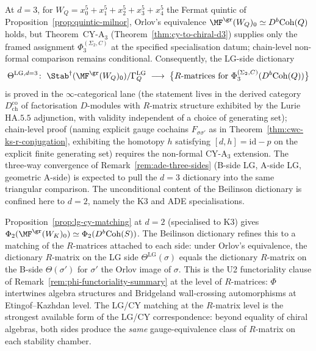 \begin{remark}[Quintic LG at \texorpdfstring{$d=3$}{d=3} and the conditional dictionary]
\label{rem:mf-quintic-conditional}
At $d=3$, for $W_Q=x_0^5+x_1^5+x_2^5+x_3^5+x_4^5$ the Fermat quintic of
Proposition~\ref{prop:quintic-milnor}, Orlov's equivalence
$\MF^{\gr}(W_Q)_0\simeq D^b\mathrm{Coh}(Q)$ holds, but Theorem~CY-A$_3$
(Theorem~\ref{thm:cy-to-chiral-d3}) supplies only the framed assignment
$\Phi_3^{(\Sigma_2,C)}$ at the specified specialisation datum;
chain-level non-formal comparison remains conditional. Consequently, the LG-side
dictionary
\[
 \Theta^{\mathrm{LG},d=3}\colon\;
 \Stab^\dagger(\MF^{\gr}(W_Q)_0)/\Gamma^{\mathrm{LG}}_Q
 \;\longrightarrow\;
	 \bigl\{R\text{-matrices for }\Phi_3^{(\Sigma_2,C)}(D^b\mathrm{Coh}(Q))\bigr\}
\]
is proved in the $\infty$-categorical lane (the statement lives
in the derived category $D^{\mathrm{co}}_{\mathrm{ch}}$ of
factorisation $D$-modules with $R$-matrix structure exhibited by
the Lurie $\mathrm{HA}.5.5$ adjunction, with validity independent of a
choice of generating set); chain-level proof (naming
explicit gauge cochains $F_{\sigma\sigma'}$ as in
Theorem~\ref{thm:cwc-ks-r-conjugation}, exhibiting the homotopy
$h$ satisfying $[d, h] = \mathrm{id} - p$ on the explicit
finite generating set) requires the non-formal CY-A$_3$ extension. The three-way convergence of
Remark~\ref{rem:ade-three-sides} (B-side LG, A-side LG, geometric A-side)
is expected to pull the $d=3$ dictionary into the same triangular
comparison. The unconditional content of the Beilinson dictionary is
confined here to \(d=2\), namely the K3 and ADE specialisations.
\end{remark}

\begin{remark}
\label{rem:mf-lg-cy-rmatrix-matching}
Proposition~\ref{prop:lg-cy-matching} at $d=2$ (specialised to K3) gives
$\Phi_2(\MF^{\gr}(W_K)_0)\simeq\Phi_2(D^b\mathrm{Coh}(S))$. The Beilinson dictionary refines
this to a matching of the $R$-matrices attached to each side: under
Orlov's equivalence, the dictionary $R$-matrix on the LG side
$\Theta^{\mathrm{LG}}(\sigma)$ equals the dictionary $R$-matrix on the
B-side $\Theta(\sigma')$ for $\sigma'$ the Orlov image of $\sigma$.
This is the U2 functoriality clause of
Remark~\ref{rem:phi-functoriality-summary} at the level of $R$-matrices:
$\Phi$ intertwines algebra structures and Bridgeland wall-crossing
automorphisms at Etingof--Kazhdan level.
The LG/CY matching at the $R$-matrix level is the strongest available
form of the LG/CY correspondence: beyond equality of chiral algebras,
both sides produce the \emph{same} gauge-equivalence class of
$R$-matrix on each stability chamber.
\end{remark}
